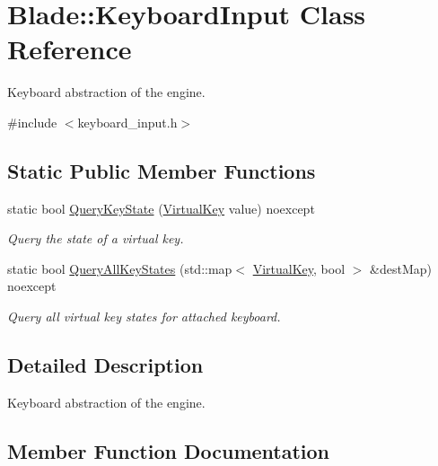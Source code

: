 \hypertarget{class_blade_1_1_keyboard_input}{}\section{Blade\+:\+:Keyboard\+Input Class Reference}
\label{class_blade_1_1_keyboard_input}


Keyboard abstraction of the engine.  




{\ttfamily \#include $<$keyboard\+\_\+input.\+h$>$}

\subsection*{Static Public Member Functions}
\begin{DoxyCompactItemize}
\item 
static bool \hyperlink{class_blade_1_1_keyboard_input_a9430c44501f4c2a4c3550be2b4bc05d0}{Query\+Key\+State} (\hyperlink{namespace_blade_a15d9bde4921fb2a9a953f8d97ea49d1c}{Virtual\+Key} value) noexcept
\begin{DoxyCompactList}\small\item\em Query the state of a virtual key. \end{DoxyCompactList}\item 
static bool \hyperlink{class_blade_1_1_keyboard_input_acf01cd89bda99e5508dbe7560447651c}{Query\+All\+Key\+States} (std\+::map$<$ \hyperlink{namespace_blade_a15d9bde4921fb2a9a953f8d97ea49d1c}{Virtual\+Key}, bool $>$ \&dest\+Map) noexcept
\begin{DoxyCompactList}\small\item\em Query all virtual key states for attached keyboard. \end{DoxyCompactList}\end{DoxyCompactItemize}


\subsection{Detailed Description}
Keyboard abstraction of the engine. 

\subsection{Member Function Documentation}
\mbox{\label{class_blade_1_1_keyboard_input_acf01cd89bda99e5508dbe7560447651c}} 
